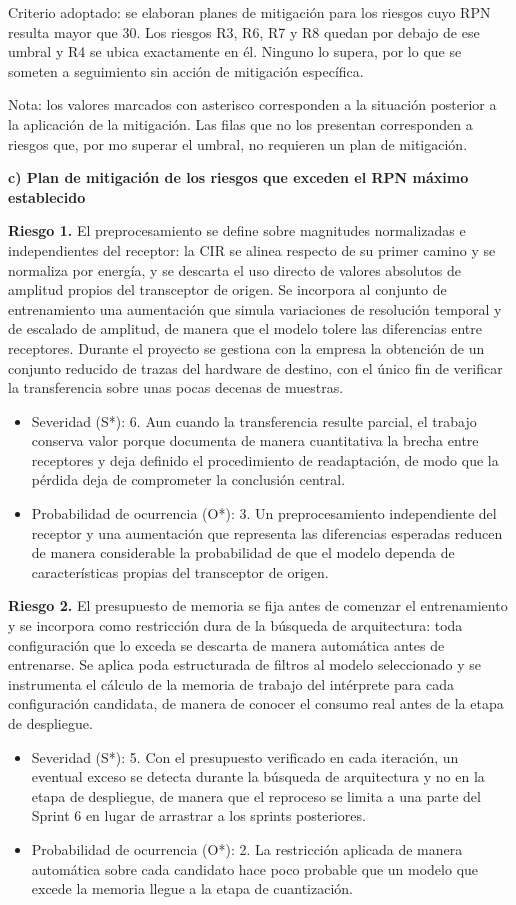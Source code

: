 \documentclass[
11pt, %
]{charter}
\begin{document}
Criterio adoptado: se elaboran planes de mitigación para los riesgos cuyo RPN resulta mayor que 30. Los riesgos R3, R6, R7 y R8 quedan por debajo de ese umbral y R4 se ubica exactamente en él. Ninguno lo supera, por lo que se someten a seguimiento sin acción de mitigación específica.

Nota: los valores marcados con asterisco corresponden a la situación posterior a la aplicación de la mitigación. Las filas que no los presentan corresponden a riesgos que, por mo superar el umbral, no requieren un plan de mitigación.

\textbf{c) Plan de mitigación de los riesgos que exceden el RPN máximo establecido}

\textbf{Riesgo 1.} El preprocesamiento se define sobre magnitudes normalizadas e independientes del receptor: la CIR se alinea respecto de su primer camino y se normaliza por energía, y se descarta el uso directo de valores absolutos de amplitud propios del transceptor de origen. Se incorpora al conjunto de entrenamiento una aumentación que simula variaciones de resolución temporal y de escalado de amplitud, de manera que el modelo tolere las diferencias entre receptores. Durante el proyecto se gestiona con la empresa la obtención de un conjunto reducido de trazas del hardware de destino, con el único fin de verificar la transferencia sobre unas pocas decenas de muestras.
\begin{itemize}
    \item Severidad (S*): 6. Aun cuando la transferencia resulte parcial, el trabajo conserva valor porque documenta de manera cuantitativa la brecha entre receptores y deja definido el procedimiento de readaptación, de modo que la pérdida deja de comprometer la conclusión central.
    \item Probabilidad de ocurrencia (O*): 3. Un preprocesamiento independiente del receptor y una aumentación que representa las diferencias esperadas reducen de manera considerable la probabilidad de que el modelo dependa de características propias del transceptor de origen.
\end{itemize}

\textbf{Riesgo 2.} El presupuesto de memoria se fija antes de comenzar el entrenamiento y se incorpora como restricción dura de la búsqueda de arquitectura: toda configuración que lo exceda se descarta de manera automática antes de entrenarse. Se aplica poda estructurada de filtros al modelo seleccionado y se instrumenta el cálculo de la memoria de trabajo del intérprete para cada configuración candidata, de manera de conocer el consumo real antes de la etapa de despliegue.
\begin{itemize}
    \item Severidad (S*): 5. Con el presupuesto verificado en cada iteración, un eventual exceso se detecta durante la búsqueda de arquitectura y no en la etapa de despliegue, de manera que el reproceso se limita a una parte del Sprint 6 en lugar de arrastrar a los sprints posteriores.
    \item Probabilidad de ocurrencia (O*): 2. La restricción aplicada de manera automática sobre cada candidato hace poco probable que un modelo que excede la memoria llegue a la etapa de cuantización.
\end{itemize}
\end{document}
